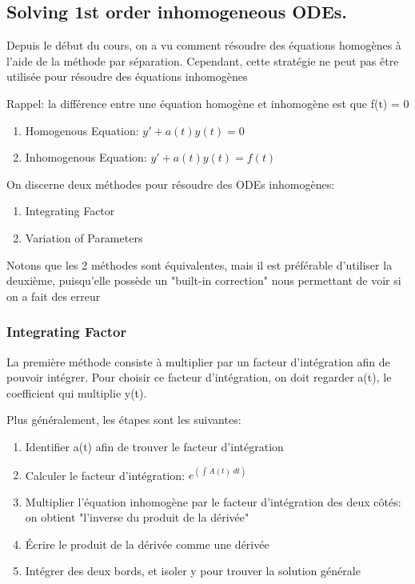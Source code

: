 \documentclass{article}
\begin{document}
\subsection{Solving 1st order inhomogeneous ODEs.}

Depuis le début du cours, on a vu comment résoudre des équations homogènes
à l'aide de la méthode par séparation. Cependant, cette stratégie ne peut pas
être utilisée pour résoudre des équations inhomogènes

Rappel: la différence entre une équation homogène et inhomogène est que f(t) = 0
\begin{enumerate}
    \item Homogenous Equation: $ y' + a(t)y(t) = 0 $
    \item Inhomogenous Equation: $ y' + a(t)y(t) = f(t)$
\end{enumerate}

On discerne deux méthodes pour résoudre des ODEs inhomogènes:
\begin{enumerate}
    \item Integrating Factor
    \item Variation of Parameters
\end{enumerate}

Notons que les 2 méthodes sont équivalentes, mais il est préférable d'utiliser
la deuxième, puisqu'elle possède un "built-in correction" nous permettant de
voir si on a fait des erreur

\subsubsection{Integrating Factor}

La première méthode consiste à multiplier par un facteur d'intégration afin de
pouvoir intégrer. Pour choisir ce facteur d'intégration, on doit regarder a(t),
le coefficient qui multiplie y(t).

Plus généralement, les étapes sont les suivantes:
\begin{enumerate}
    \item Identifier a(t) afin de trouver le facteur d'intégration
    \item Calculer le facteur d'intégration: $ e^( \int_{{}}^{{}} {A(t)} \:
	d{t} {}) $
    \item Multiplier l'équation inhomogène par le facteur d'intégration des
	deux côtés: on obtient "l'inverse du produit de la dérivée"
    \item Écrire le produit de la dérivée comme une dérivée
    \item Intégrer des deux bords, et isoler y pour trouver la solution
	générale
\end{enumerate}
\end{document}
